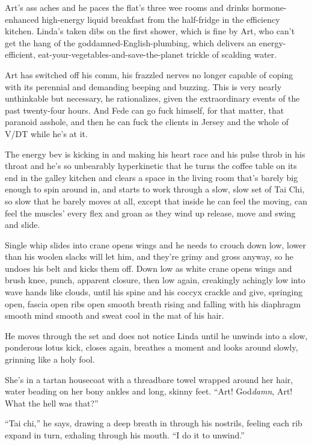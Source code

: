 Art’s ass aches and he paces the flat’s three wee rooms and drinks
hormone-enhanced high-energy liquid breakfast from the half-fridge
in the efficiency kitchen. Linda’s taken dibs on the first shower,
which is fine by Art, who can’t get the hang of the
goddamned-English-plumbing, which delivers an energy-efficient,
eat-your-vegetables-and-save-the-planet trickle of scalding water.

Art has switched off his comm, his frazzled nerves no longer
capable of coping with its perennial and demanding beeping and
buzzing. This is very nearly unthinkable but necessary, he
rationalizes, given the extraordinary events of the past
twenty-four hours. And Fede can go fuck himself, for that matter,
that paranoid asshole, and then he can fuck the clients in Jersey
and the whole of V/DT while he’s at it.

The energy bev is kicking in and making his heart race and his
pulse throb in his throat and he’s so unbearably hyperkinetic that
he turns the coffee table on its end in the galley kitchen and
clears a space in the living room that’s barely big enough to spin
around in, and starts to work through a slow, slow set of Tai Chi,
so slow that he barely moves at all, except that inside he can feel
the moving, can feel the muscles’ every flex and groan as they wind
up release, move and swing and slide.

Single whip slides into crane opens wings and he needs to crouch
down low, lower than his woolen slacks will let him, and they’re
grimy and gross anyway, so he undoes his belt and kicks them off.
Down low as white crane opens wings and brush knee, punch, apparent
closure, then low again, creakingly achingly low into wave hands
like clouds, until his spine and his coccyx crackle and give,
springing open, fascia open ribs open smooth breath rising and
falling with his diaphragm smooth mind smooth and sweat cool in the
mat of his hair.

He moves through the set and does not notice Linda until he unwinds
into a slow, ponderous lotus kick, closes again, breathes a moment
and looks around slowly, grinning like a holy fool.

She’s in a tartan housecoat with a threadbare towel wrapped around
her hair, water beading on her bony ankles and long, skinny feet.
“Art! God\emph{damn}, Art! What the hell was that?”

“Tai chi,” he says, drawing a deep breath in through his nostrils,
feeling each rib expand in turn, exhaling through his mouth. “I do
it to unwind.”

